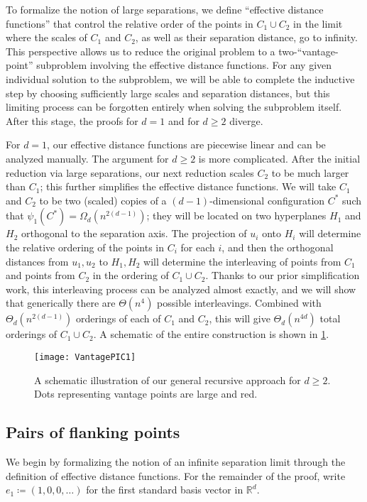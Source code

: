\documentclass[11pt]{amsart}
\theoremstyle{definition}
\newcommand{\RR}{\mathbb{R}}
\begin{document}
To formalize the notion of large separations, we define ``effective distance functions'' that control the relative order of the points in $C_1 \cup C_2$ in the limit where the scales of $C_1$ and $C_2$, as well as their separation distance, go to infinity. This perspective allows us to reduce the original problem to a two-``vantage-point'' subproblem involving the effective distance functions. For any given individual solution to the subproblem, we will be able to complete the inductive step by choosing sufficiently large scales and separation distances, but this limiting process can be forgotten entirely when solving the subproblem itself.  After this stage, the proofs for $d=1$ and for $d \geq 2$ diverge.

For $d=1$, our effective distance functions are piecewise linear and can be analyzed manually. The argument for $d \geq 2$ is more complicated.  After the initial reduction via large separations, our next reduction scales $C_2$ to be much larger than $C_1$; this further simplifies the effective distance functions.  We will take $C_1$ and $C_2$ to be two (scaled) copies of a $(d-1)$-dimensional configuration $C^*$ such that $\psi_1(C^*) = \Omega_d(n^{2(d-1)})$; they will be located on two hyperplanes $H_1$ and $H_2$ orthogonal to the separation axis. The projection of $u_i$ onto $H_i$ will determine the relative ordering of the points in $C_i$ for each $i$, and then the orthogonal distances from $u_1, u_2$ to $H_1, H_2$ will determine the interleaving of points from $C_1$ and points from $C_2$ in the ordering of $C_1 \cup C_2$.  Thanks to our prior simplification work, this interleaving process can be analyzed almost exactly, and we will show that generically there are $\Theta(n^4)$ possible interleavings. Combined with $\Theta_d(n^{2(d-1)})$ orderings of each of $C_1$ and $C_2$, this will give $\Theta_d(n^{4d})$ total orderings of $C_1 \cup C_2$. A schematic of the entire construction is shown in \cref{fig:constructionschematic}. 

\begin{figure}[tbp]
\begin{center}{\texttt{[image: VantagePIC1]}}
\end{center}
\caption{A schematic illustration of our general recursive approach for $d \geq 2$. Dots representing vantage points are large and red.}
\label{fig:constructionschematic}
\end{figure}


\subsection{Pairs of flanking points} 
We begin by formalizing the notion of an infinite separation limit through the definition of effective distance functions. For the remainder of the proof, write $e_1 \coloneqq (1,0, 0,\ldots)$ for the first standard basis vector in $\RR^d$.
\end{document}
